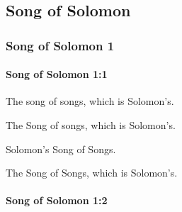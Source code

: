 \subsection{Song of Solomon}
	\label{SONGOFSOLOMON}

	\subsubsection{Song of Solomon 1} %
		\label{SONGOFSOLOMON-1}

		\paragraph{Song of Solomon 1:1} %
			\label{SONGOFSOLOMON-1-1}

			The song of songs, which is Solomon’s.

			\begin{versebox}
					\item[BHS] 
					\item[LXX] 
					\item[ASV] The Song of songs, which is Solomon's.
					\item[NIV] Solomon’s Song of Songs.
					\item[NRSV] The Song of Songs, which is Solomon’s.
			\end{versebox}

		\paragraph{Song of Solomon 1:2} %
			\label{SONGOFSOLOMON-1-2}

